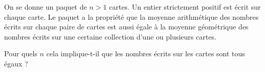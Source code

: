 On se donne un paquet de $n > 1$ cartes. Un entier strictement positif est
écrit sur chaque carte. Le paquet a la propriété que la moyenne arithmétique
des nombres écrits sur chaque paire de cartes est aussi égale à la moyenne
géométrique des nombres écrits sur une certaine collection d'une ou plusieurs
cartes.

Pour quels $n$ cela implique-t-il que les nombres écrits sur les cartes sont
tous égaux ?
